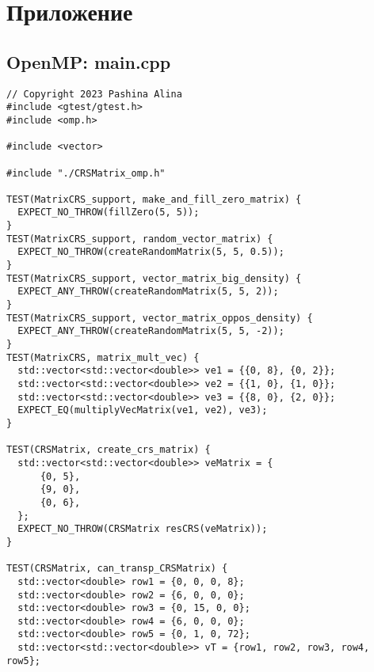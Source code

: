 \documentclass[14pt, russian]{extarticle}
\begin{document}
	\section{Приложение}
	
	\subsection{OpenMP: main.cpp}
	\begin{lstlisting}
// Copyright 2023 Pashina Alina
#include <gtest/gtest.h>
#include <omp.h>

#include <vector>

#include "./CRSMatrix_omp.h"

TEST(MatrixCRS_support, make_and_fill_zero_matrix) {
  EXPECT_NO_THROW(fillZero(5, 5));
}
TEST(MatrixCRS_support, random_vector_matrix) {
  EXPECT_NO_THROW(createRandomMatrix(5, 5, 0.5));
}
TEST(MatrixCRS_support, vector_matrix_big_density) {
  EXPECT_ANY_THROW(createRandomMatrix(5, 5, 2));
}
TEST(MatrixCRS_support, vector_matrix_oppos_density) {
  EXPECT_ANY_THROW(createRandomMatrix(5, 5, -2));
}
TEST(MatrixCRS, matrix_mult_vec) {
  std::vector<std::vector<double>> ve1 = {{0, 8}, {0, 2}};
  std::vector<std::vector<double>> ve2 = {{1, 0}, {1, 0}};
  std::vector<std::vector<double>> ve3 = {{8, 0}, {2, 0}};
  EXPECT_EQ(multiplyVecMatrix(ve1, ve2), ve3);
}

TEST(CRSMatrix, create_crs_matrix) {
  std::vector<std::vector<double>> veMatrix = {
      {0, 5},
      {9, 0},
      {0, 6},
  };
  EXPECT_NO_THROW(CRSMatrix resCRS(veMatrix));
}

TEST(CRSMatrix, can_transp_CRSMatrix) {
  std::vector<double> row1 = {0, 0, 0, 8};
  std::vector<double> row2 = {6, 0, 0, 0};
  std::vector<double> row3 = {0, 15, 0, 0};
  std::vector<double> row4 = {6, 0, 0, 0};
  std::vector<double> row5 = {0, 1, 0, 72};
  std::vector<std::vector<double>> vT = {row1, row2, row3, row4, row5};


\end{lstlisting}
\end{document}
